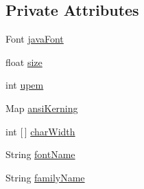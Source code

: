 \subsection*{Private Attributes}
\begin{DoxyCompactItemize}
\item 
Font \mbox{\hyperlink{classorg_1_1newdawn_1_1slick_1_1tools_1_1hiero_1_1truetype_1_1_font_data_ab48e0ef57ae93083499407b9998d93a6}{java\+Font}}
\item 
float \mbox{\hyperlink{classorg_1_1newdawn_1_1slick_1_1tools_1_1hiero_1_1truetype_1_1_font_data_a96af538e2a7368fdba46ffc2ad6a9a0e}{size}}
\item 
int \mbox{\hyperlink{classorg_1_1newdawn_1_1slick_1_1tools_1_1hiero_1_1truetype_1_1_font_data_ab589aa26cfcd58d7e7f8ffa3c68800a5}{upem}}
\item 
Map \mbox{\hyperlink{classorg_1_1newdawn_1_1slick_1_1tools_1_1hiero_1_1truetype_1_1_font_data_ab28272a83e0e9aa3836fbc5f7d913801}{ansi\+Kerning}}
\item 
int \mbox{[}$\,$\mbox{]} \mbox{\hyperlink{classorg_1_1newdawn_1_1slick_1_1tools_1_1hiero_1_1truetype_1_1_font_data_a2080ecdf80e54bb38848255c70b43706}{char\+Width}}
\item 
String \mbox{\hyperlink{classorg_1_1newdawn_1_1slick_1_1tools_1_1hiero_1_1truetype_1_1_font_data_a310b630dcf7d0c51861fcf095324bbb4}{font\+Name}}
\item 
String \mbox{\hyperlink{classorg_1_1newdawn_1_1slick_1_1tools_1_1hiero_1_1truetype_1_1_font_data_a287c606f09e3581f4eaea1b7bd81ded1}{family\+Name}}
\end{DoxyCompactItemize}

